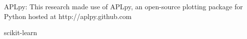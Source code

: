 APLpy: This research made use of APLpy, an open-source plotting package for Python hosted at http://aplpy.github.com

scikit-learn \citep{scikit-learn}

